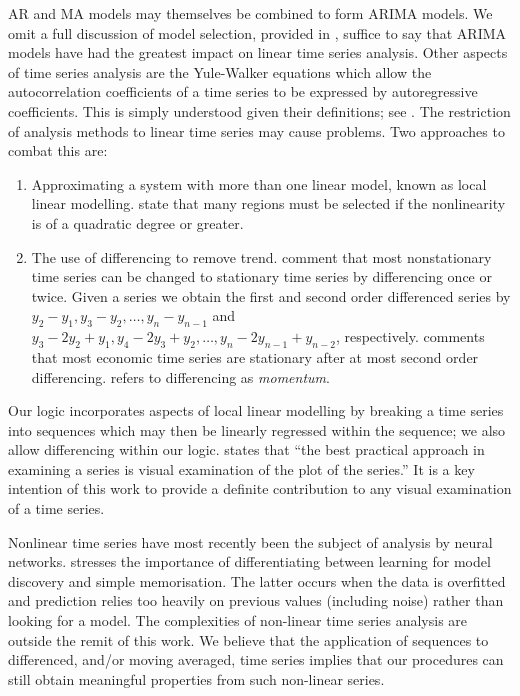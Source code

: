 AR and MA models may themselves be combined to form ARIMA models.
We omit a full discussion of model selection,
provided in
\cite{ko90,end95}, suffice to say that ARIMA models have had the
greatest impact on linear time series analysis. Other aspects of time
series analysis are the Yule-Walker equations which allow the
autocorrelation coefficients of a time series to be expressed by
autoregressive coefficients. This is simply understood given their
definitions; see \cite{ko90}. The restriction of analysis methods to
linear time series may cause problems. Two approaches to combat this
are:
\begin{enumerate}
\item Approximating a system with more than one linear model, known as
local linear modelling. \cite{wg94} state that many regions must be
selected if the nonlinearity is of a quadratic degree or greater.
\item The use of differencing to remove trend. \cite{naze88,end95}
comment that most nonstationary time series can be changed to
stationary time series by differencing once or twice. Given a series
 we obtain the first and second order differenced series by 
$y_2 - y_1, y_3 - y_2, \ldots, y_n - y_{n-1}$ and 
$y_3 - 2y_2 + y_1, y_4 - 2y_3 + y_2, \ldots, y_n - 2y_{n-1} +
y_{n-2}$, respectively. \cite{naze88} comments that most economic time
series are stationary after at most second order
differencing. \cite{raf99} refers to differencing as {\em momentum}.
\end{enumerate}

Our logic incorporates aspects of local linear modelling by breaking a
time series into sequences which may then be linearly regressed within
the sequence; we also allow differencing within our
logic. \cite{naze88} states that ``the best practical approach in
examining a series is visual examination of the plot of the series.''
It is a key intention of this work to provide a definite contribution
to any visual examination of a time series.  

\medskip

Nonlinear time series have most recently been the subject of analysis
by neural networks. \cite{wg94} stresses the importance of
differentiating between learning for model discovery and simple
memorisation. The latter occurs when the data is overfitted and
prediction relies too heavily on previous values (including noise)
rather than looking for a model. The complexities of non-linear time
series analysis are outside the remit of this work. We believe that
the application of sequences to differenced, and/or moving averaged,
time series implies that our
procedures can still obtain meaningful properties from such non-linear series.

